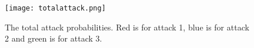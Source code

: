 \begin{figure}[h]\centering
	  \texttt{[image: totalattack.png]}
	  \caption{The total attack probabilities. Red is for attack 1, blue is for attack 2 and green is for attack 3.}
	  \label{fig:total}
\end{figure}



















